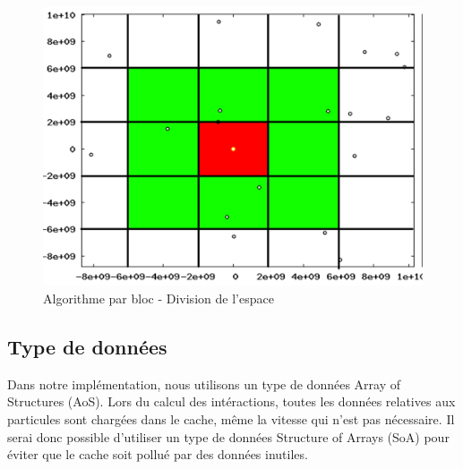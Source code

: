 \documentclass{article}
\begin{document}
\begin{figure}[ht]
  \centering
  \includegraphics[scale=0.5]{ResultTDP2/algobloc.pdf}
  \caption{\label{algobloc}Algorithme par bloc - Division de l'espace}
\end{figure}

\subsection{Type de données}
\label{subsec:datatype}
Dans notre implémentation, nous utilisons un type de données Array of Structures (AoS). Lors du calcul des intéractions, toutes les données relatives aux particules sont chargées dans le cache, même la vitesse qui n'est pas nécessaire. Il serai donc possible d'utiliser un type de données Structure of Arrays (SoA) pour éviter que le cache soit pollué par des données inutiles.
\end{document}
